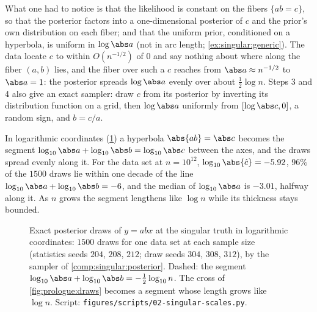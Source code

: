 \begin{refsection}
What one had to notice is that the likelihood is constant on the fibers $\{ab=c\}$, so that the posterior factors into a one-dimensional posterior of $c$ and the prior's own distribution on each fiber; and that the uniform prior, conditioned on a hyperbola, is uniform in $\log\abs a$ (not in arc length; \cref{ex:singular:generic}). The data locate $c$ to within $O(n^{-1/2})$ of $0$ and say nothing about where along the fiber $(a,b)$ lies, and the fiber over such a $c$ reaches from $\abs a\approx n^{-1/2}$ to $\abs a=1$: the posterior spreads $\log\abs a$ evenly over about $\frac12\log n$. Steps 3 and 4 also give an exact sampler: draw $c$ from its posterior by inverting its distribution function on a grid, then $\log\abs a$ uniformly from $[\log\abs c,0]$, a random sign, and $b=c/a$.

In logarithmic coordinates (\cref{fig:singular:loglog}) a hyperbola $\abs{ab}=\abs c$ becomes the segment $\log_{10}\abs a+\log_{10}\abs b=\log_{10}\abs c$ between the axes, and the draws spread evenly along it. For the data set at $n=10^{12}$, $\log_{10}\abs{\hat c}=-5.92$, $96\%$ of the $1500$ draws lie within one decade of the line $\log_{10}\abs a+\log_{10}\abs b=-6$, and the median of $\log_{10}\abs a$ is $-3.01$, halfway along it. As $n$ grows the segment lengthens like $\log n$ while its thickness stays bounded.

\begin{figure}[t]
\centering
{}
\caption{Exact posterior draws of $y=abx$ at the singular truth in logarithmic coordinates: $1500$ draws for one data set at each sample size (statistics seeds $204$, $208$, $212$; draw seeds $304$, $308$, $312$), by the sampler of \cref{comp:singular:posterior}. Dashed: the segment $\log_{10}\abs a+\log_{10}\abs b=-\frac12\log_{10}n$. The cross of \cref{fig:prologue:draws} becomes a segment whose length grows like $\log n$. Script: \texttt{figures/scripts/02-singular-scales.py}.}\label{fig:singular:loglog}
\end{figure}


\end{refsection}
